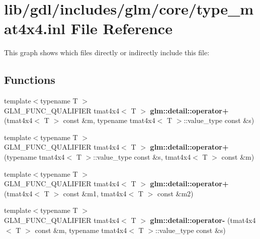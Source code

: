 \hypertarget{type__mat4x4_8inl}{}\section{lib/gdl/includes/glm/core/type\+\_\+mat4x4.inl File Reference}
\label{type__mat4x4_8inl}
This graph shows which files directly or indirectly include this file\+:
\subsection*{Functions}
\begin{DoxyCompactItemize}
\item 
\hypertarget{namespaceglm_1_1detail_a083841e8898763bb3eb998a12e7e17e7}{}{\footnotesize template$<$typename T $>$ }\\G\+L\+M\+\_\+\+F\+U\+N\+C\+\_\+\+Q\+U\+A\+L\+I\+F\+I\+E\+R tmat4x4$<$ T $>$ {\bfseries glm\+::detail\+::operator+} (tmat4x4$<$ T $>$ const \&m, typename tmat4x4$<$ T $>$\+::value\+\_\+type const \&s)\label{namespaceglm_1_1detail_a083841e8898763bb3eb998a12e7e17e7}

\item 
\hypertarget{namespaceglm_1_1detail_ab9eca823432fd7598fc78ad3b9420cf4}{}{\footnotesize template$<$typename T $>$ }\\G\+L\+M\+\_\+\+F\+U\+N\+C\+\_\+\+Q\+U\+A\+L\+I\+F\+I\+E\+R tmat4x4$<$ T $>$ {\bfseries glm\+::detail\+::operator+} (typename tmat4x4$<$ T $>$\+::value\+\_\+type const \&s, tmat4x4$<$ T $>$ const \&m)\label{namespaceglm_1_1detail_ab9eca823432fd7598fc78ad3b9420cf4}

\item 
\hypertarget{namespaceglm_1_1detail_ac9370bb87b47a02306b13b558092d0f5}{}{\footnotesize template$<$typename T $>$ }\\G\+L\+M\+\_\+\+F\+U\+N\+C\+\_\+\+Q\+U\+A\+L\+I\+F\+I\+E\+R tmat4x4$<$ T $>$ {\bfseries glm\+::detail\+::operator+} (tmat4x4$<$ T $>$ const \&m1, tmat4x4$<$ T $>$ const \&m2)\label{namespaceglm_1_1detail_ac9370bb87b47a02306b13b558092d0f5}

\item 
\hypertarget{namespaceglm_1_1detail_ac4a53ae4ed2d7973eab134462242e5ee}{}{\footnotesize template$<$typename T $>$ }\\G\+L\+M\+\_\+\+F\+U\+N\+C\+\_\+\+Q\+U\+A\+L\+I\+F\+I\+E\+R tmat4x4$<$ T $>$ {\bfseries glm\+::detail\+::operator-\/} (tmat4x4$<$ T $>$ const \&m, typename tmat4x4$<$ T $>$\+::value\+\_\+type const \&s)\label{namespaceglm_1_1detail_ac4a53ae4ed2d7973eab134462242e5ee}


\end{DoxyCompactItemize}
